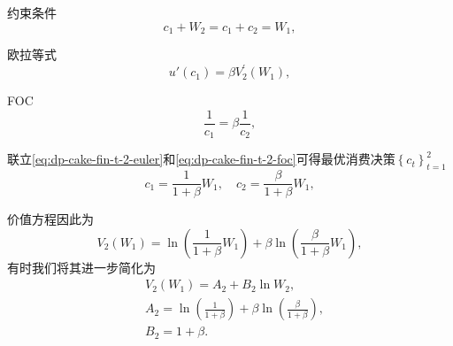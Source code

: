 约束条件
\begin{equation}
  \label{eq:dp-cake-fin-t-2-euler}
  c_{1}+ W_{2} = c_{1} + c_{2} = W_{1},
\end{equation}

欧拉等式
\begin{equation*}
  u' \left( c_{1} \right) = \beta V_{2}^{'} \left( W_{1} \right),
\end{equation*}

FOC
\begin{equation}
  \label{eq:dp-cake-fin-t-2-foc}
  \frac{1}{c_{1}} = \beta \frac{1}{c_{2}},
\end{equation}

联立\eqref{eq:dp-cake-fin-t-2-euler}和\eqref{eq:dp-cake-fin-t-2-foc}可得最优消费决策$\left\{ c_{t} \right\}_{t=1}^{2}$
\begin{equation}
  c_{1} = \frac{1}{1+\beta} W_{1}, \quad c_{2} = \frac{\beta}{1+\beta} W_{1},
\end{equation}

价值方程因此为
\begin{equation}
  \label{eq:dp-cake-fin-t-2-value-function}
  V_{2} \left( W_{1} \right) =
  \ln
  \left(
  \frac{1}{1+\beta} W_{1}
  \right)
  + \beta \ln
  \left(
  \frac{\beta}{1+\beta} W_{1}
  \right),
\end{equation}
有时我们将其进一步简化为
\begin{equation*}
  \begin{split}
  & V_{2} \left( W_{1} \right)
  = A_{2} + B_{2} \ln W_{2}, \\
  & A_{2} = \ln \left( \frac{1}{1 + \beta} \right)+ \beta \ln \left( \frac{\beta}{1+\beta} \right), \\
  & B_{2} = 1+\beta.
  \end{split}
\end{equation*}

